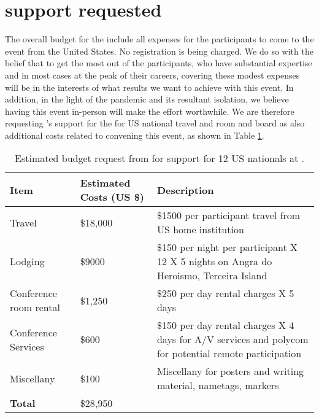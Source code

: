 \section{\nsf support requested}

The overall budget for the \symp include all expenses for the
participants to come to the event from the United States. No
registration is being charged. We do so with the belief that to get
the most out of the participants, who have substantial expertise and
in most cases at the peak of their careers, covering these modest
expenses will be in the interests of what results we want to achieve
with this event. In addition, in the light of the pandemic and its
resultant isolation, we believe having this event in-person will make
the effort worthwhile.  We are therefore requesting \nsfe's support
for the \symp for US national travel and room and board as also
additional costs related to convening this event, as shown in Table
\ref{tab:nsf-budget}.

\begin{table}[!h]
  \footnotesize{
    \centering    
    \begin{tabular}{|p{3.0cm}|p{1.6cm}|p{10cm}|}
      \hline 
      \rowcolor{Gray}
      \bfseries Item& \bfseries Estimated Costs (US \$)&\bfseries Description\\
      \hline
      Travel & \$18,000 & \$1500 per participant travel from US home institution \\
      \hline
      Lodging& \$9000 & \$150 per night per participant X 12 X 5 nights on Angra do Heroismo, Terceira Island\\
      \hline
      Conference room rental &\$1,250 & \$250 per day rental charges X
                                        5 days\\
      \hline
      Conference Services& \$600 &  \$150 per day rental charges X 4
                                   days for A/V services and
                                   polycom for potential remote
                                   participation\\
      \hline
      Miscellany& \$100 & Miscellany for posters and writing material,
                          nametags, markers\\
      \hline
      \textbf{Total}& \$28,950&\\
      \hline        
  \end{tabular}
  \caption{Estimated budget request from \nsf for support for 12 US
    nationals at \sympe.}
  \label{tab:nsf-budget}
}
\end{table}

